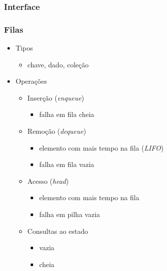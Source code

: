 \documentclass{beamer}
\begin{document}
\begin{frame}
  \frametitle{Interface}
  \frametitle{Filas}

  \begin{itemize}
    \item Tipos
      \begin{itemize}
        \item chave, dado, coleção
      \end{itemize}
    \item Operações
      \begin{itemize}
        \item Inserção (\textit{enqueue\/})
          \begin{itemize}
            \item falha em fila cheia
          \end{itemize}
        \item Remoção (\textit{dequeue\/})
          \begin{itemize}
            \item elemento com mais tempo na fila (\textit{LIFO\/})
            \item falha em fila vazia
          \end{itemize}
        \item Acesso  (\textit{head\/})
          \begin{itemize}
            \item elemento com mais tempo na fila
            \item falha em pilha vazia
          \end{itemize}
        \item Consultas ao estado
          \begin{itemize}
          \item vazia
          \item cheia
          \end{itemize}
      \end{itemize}
  \end{itemize}
\end{frame}
\end{document}
